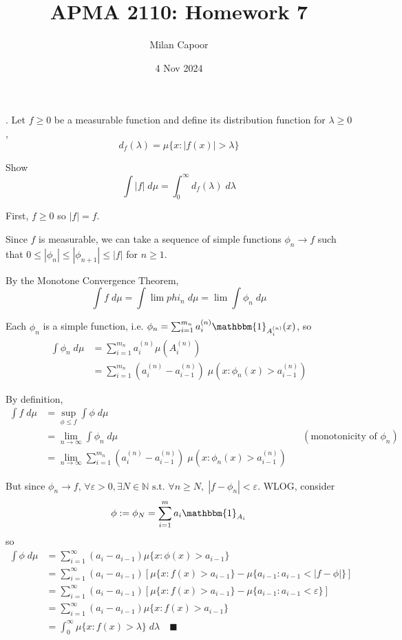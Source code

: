 \documentclass[12pt]{report}
\title{APMA 2110: Homework 7}
\author{Milan Capoor}
\date{4 Nov 2024}
\newcommand{\N}{\mathbb{N}}
\newcommand{\ind}{\mathbbm{1}}
\newcommand{\qed}{\quad \blacksquare}
\newcommand{\abs}[1]{\left\vert #1 \right\vert}
\newcommand{\ep}{\varepsilon}
\newcommand{\st}{\text{ s.t. }}
\begin{document}
. Let $f \geq 0$ be a measurable function and define its distribution function for $\lambda \geq 0$,
\[d_f(\lambda) = \mu\{x: \abs{f(x)} > \lambda\}\]

Show 
\[\int \abs f \; d\mu = \int_0^{\infty} d_f(\lambda) \; d\lambda\]

    \color{blue}
        First, $f \geq 0$ so $\abs{f} = f$. 

        Since $f$ is measurable, we can take a sequence of simple functions $\phi_n \to f$ such that $0 \leq \abs{\phi_n} \leq \abs{\phi_{n+1}} \leq \abs{f}$ for $n \geq 1$. 

        By the Monotone Convergence Theorem,
        \[\int f \; d\mu = \int \lim phi_n \; d\mu = \lim \int \phi_n \; d\mu\]

        Each $\phi_n$ is a simple function, i.e. $\phi_n = \sum_{i=1}^{m_n} a_i^{(n)} \ind_{A_i^{(n)}}(x)$, so
        \begin{align*}
            \int \phi_n \; d\mu &= \sum_{i=1}^{m_n} a_i^{(n)} \mu(A_i^{(n)})\\ 
                &= \sum_{i=1}^{m_n} (a_i^{(n)} - a_{i-1}^{(n)})\; \mu(x: \phi_n(x) > a_{i-1}^{(n)})
        \end{align*}

        By definition,
        \begin{align*}
            \int f \; d\mu &= \sup_{\phi \leq f} \int \phi \; d\mu\\ 
            &= \lim_{n \to \infty} \int \phi_n \; d\mu && (\text{monotonicity of } \phi_n)\\ 
            &= \lim_{n \to \infty} \sum_{i=1}^{m_n} (a_i^{(n)} - a_{i-1}^{(n)})\; \mu(x: \phi_n(x) > a_{i-1}^{(n)})
        \end{align*}

        But since $\phi_n \to f$, $\forall \ep > 0, \exists N \in \N \st \forall n \geq N, \; \abs{f - \phi_n} < \ep$. WLOG, consider 
        \[\phi := \phi_N = \sum_{i=1}^m a_i \ind_{A_i}\]
        so 
        \begin{align*}
            \int \phi \; d\mu &= \sum_{i=1}^{\infty} (a_i - a_{i-1})\mu\{x: \phi(x) > a_{i-1}\}\\ 
            &= \sum_{i=1}^{\infty} (a_i - a_{i-1})\left[\mu\{x: f(x) > a_{i-1}\} - \mu\{a_{i-1}: a_{i-1} < \abs{f - \phi}\} \right]\\ 
            &= \sum_{i=1}^{\infty} (a_i - a_{i-1})\left[\mu\{x: f(x) > a_{i-1}\} - \mu\{a_{i-1}: a_{i-1} < \ep\} \right]\\ 
            &= \sum_{i=1}^{\infty}(a_i - a_{i-1})\mu\{x: f(x) > a_{i-1}\}\\ 
            &= \int_0^{\infty} \mu\{x: f(x) > \lambda\} \; d\lambda \qed
        \end{align*}
\end{document}
